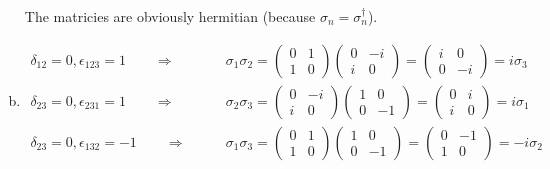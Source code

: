 \documentclass[a4paper,german,12pt,smallheadings]{scrartcl}
\begin{document}
\begin{enumerate}[a)]
    The matricies are obviously hermitian (because $\sigma_n = \sigma_n^\dagger$).
  \item
    \begin{align*}
      \delta_{12} = 0, \epsilon_{123} = 1 \qquad\Rightarrow\qquad
      &\sigma_1\sigma_2 =
      \begin{pmatrix} 0 & 1 \\ 1 & 0 \end{pmatrix}
      \begin{pmatrix} 0 & -i \\ i & 0 \end{pmatrix}
      =
      \begin{pmatrix} i & 0 \\ 0 & -i \end{pmatrix} = i\sigma_3 \\
      \delta_{23} = 0, \epsilon_{231} = 1 \qquad\Rightarrow\qquad
      &\sigma_2\sigma_3 =
      \begin{pmatrix} 0 & -i \\ i & 0 \end{pmatrix}
      \begin{pmatrix} 1 & 0 \\ 0 & -1\end{pmatrix}
      =
      \begin{pmatrix} 0 & i \\ i & 0\end{pmatrix} = i\sigma_1 \\
      \delta_{23} = 0, \epsilon_{132} = -1 \qquad\Rightarrow\qquad
      &\sigma_1\sigma_3 =
      \begin{pmatrix} 0 & 1 \\ 1 & 0 \end{pmatrix}
      \begin{pmatrix} 1 & 0 \\ 0 & -1\end{pmatrix}
      =
      \begin{pmatrix} 0 & -1 \\ 1 & 0\end{pmatrix}
      = -i\sigma_2
    \end{align*}
\end{enumerate}
\end{document}
